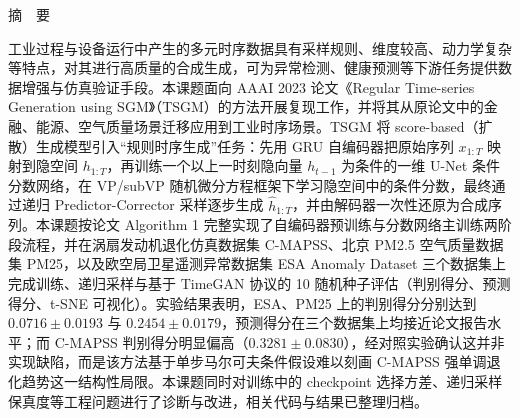 \clearpage
\thispagestyle{fancy}
\begin{center}
{\heiti \reporttitle}
\end{center}

\vspace{1.2em}
\begin{center}
{\heiti 摘\ \ 要}
\end{center}
\vspace{0.6em}

{\songti
工业过程与设备运行中产生的多元时序数据具有采样规则、维度较高、动力学复杂等特点，对其进行高质量的合成生成，可为异常检测、健康预测等下游任务提供数据增强与仿真验证手段。本课题面向 AAAI 2023 论文《Regular Time-series Generation using SGM》（TSGM）的方法开展复现工作，并将其从原论文中的金融、能源、空气质量场景迁移应用到工业时序场景。TSGM 将 score-based（扩散）生成模型引入“规则时序生成”任务：先用 GRU 自编码器把原始序列 $x_{1:T}$ 映射到隐空间 $h_{1:T}$，再训练一个以上一时刻隐向量 $h_{t-1}$ 为条件的一维 U-Net 条件分数网络，在 VP/subVP 随机微分方程框架下学习隐空间中的条件分数，最终通过递归 Predictor-Corrector 采样逐步生成 $\hat h_{1:T}$，并由解码器一次性还原为合成序列。本课题按论文 Algorithm 1 完整实现了自编码器预训练与分数网络主训练两阶段流程，并在涡扇发动机退化仿真数据集 C-MAPSS、北京 PM2.5 空气质量数据集 PM25，以及欧空局卫星遥测异常数据集 ESA Anomaly Dataset 三个数据集上完成训练、递归采样与基于 TimeGAN 协议的 10 随机种子评估（判别得分、预测得分、t-SNE 可视化）。实验结果表明，ESA、PM25 上的判别得分分别达到 $0.0716\pm0.0193$ 与 $0.2454\pm0.0179$，预测得分在三个数据集上均接近论文报告水平；而 C-MAPSS 判别得分明显偏高（$0.3281\pm0.0830$），经对照实验确认这并非实现缺陷，而是该方法基于单步马尔可夫条件假设难以刻画 C-MAPSS 强单调退化趋势这一结构性局限。本课题同时对训练中的 checkpoint 选择方差、递归采样保真度等工程问题进行了诊断与改进，相关代码与结果已整理归档。

}

\vspace{1.0em}
